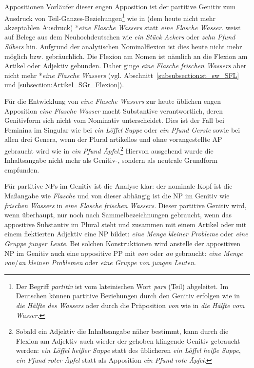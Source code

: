 \begin{Exkurs}{Appositionen}
Vorläufer dieser engen Apposition ist der partitive Genitiv zum Ausdruck von Teil-Ganzes-Beziehungen\footnote{Der Begriff \textit{partitiv} ist vom lateinischen Wort \textit{pars} (Teil) abgeleitet. Im Deutschen können partitive Beziehungen durch den Genitiv erfolgen wie in \textit{die Hälfte des Wassers} oder durch die Präposition \textit{von} wie in \textit{die Hälfte vom Wasser}.} wie in (dem heute nicht mehr akzeptablen Ausdruck) *\textit{eine Flasche Wassers} statt \textit{eine Flasche Wasser}. \citet[294]{Paul1919} weist auf Belege aus dem Neuhochdeutschen wie \textit{ein Stück Ackers} oder \textit{zehn Pfund Silbers} hin. Aufgrund der analytischen Nominalflexion ist dies heute nicht mehr möglich bzw. gebräuchlich. Die Flexion am Nomen ist nämlich an die Flexion am Artikel oder Adjektiv gebunden. Daher ginge \textit{eine Flasche frischen Wassers} aber nicht mehr *\textit{eine Flasche Wassers} (vgl. Abschnitt~\ref{subsubsection:st_sw_SFL} und \ref{subsection:Artikel_SGr_Flexion}). 

Für die Entwicklung von \textit{eine Flasche Wassers} zur heute üblichen engen Apposition \textit{eine Flasche Wasser} macht \citet[294--295]{Paul1919} Substantive verantwortlich, deren Genitivform sich nicht vom Nominativ unterscheidet. Dies ist der Fall bei Feminina im Singular wie bei \textit{ein Löffel Suppe} oder \textit{ein Pfund Gerste} sowie bei allen drei Genera, wenn der Plural artikellos und ohne vorangestellte AP gebraucht wird wie in \textit{ein Pfund Äpfel}.\footnote{Sobald ein Adjektiv die Inhaltsangabe näher bestimmt, kann durch die Flexion am Adjektiv auch wieder der gehoben klingende Genitiv gebraucht werden: \textit{ein Löffel heißer Suppe} statt des üblicheren \textit{ein Löffel heiße Suppe}, \textit{ein Pfund roter Äpfel} statt als Apposition \textit{ein Pfund rote Äpfel}.} Hiervon ausgehend wurde die Inhaltsangabe nicht mehr als Genitiv-, sondern als neutrale Grundform empfunden. 

Für partitive NPs im Genitiv ist die Analyse klar: der nominale Kopf ist die Maßangabe wie \textit{Flasche} und von dieser abhängig ist die NP im Genitiv wie \textit{frischen Wassers} in \textit{eine Flasche frischen Wassers}. Dieser partitive Genitiv wird, wenn überhaupt, nur noch nach Sammelbezeichnungen gebraucht, wenn das appositive Substantiv im Plural steht und zusammen mit einem Artikel oder mit einem flektierten Adjektiv eine NP bildet: \textit{eine Menge kleiner Probleme} oder \textit{eine Gruppe junger Leute}. Bei solchen Konstruktionen wird anstelle der appositiven NP im Genitiv auch eine appositive PP mit \textit{von} oder \textit{an} gebraucht: \textit{eine Menge von}/\textit{an kleinen Problemen} oder \textit{eine Gruppe von jungen Leuten}.


\end{Exkurs}
